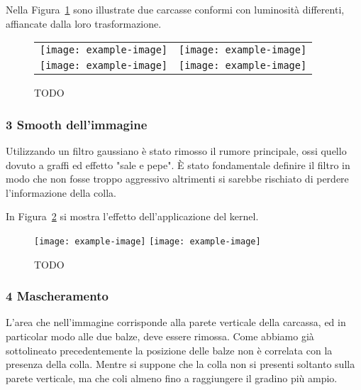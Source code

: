 Nella Figura~\ref{fig:equalizzazione} sono illustrate due carcasse conformi con luminosità differenti, affiancate dalla loro trasformazione.
\begin{figure}[ht] %
  \begin{center}
    \begin{tabular}{cc}
      \texttt{[image: example-image]} &
      \texttt{[image: example-image]} \\
      \texttt{[image: example-image]} &
      \texttt{[image: example-image]}
    \end{tabular}
    \label{fig:equalizzazione}
    \caption{TODO}
  \end{center}
\end{figure}


\subsubsection{3 Smooth dell'immagine}
Utilizzando un filtro gaussiano è stato rimosso il rumore principale, ossi quello dovuto a graffi ed effetto "sale e pepe".
È stato fondamentale definire il filtro in modo che non fosse troppo aggressivo altrimenti si sarebbe rischiato di perdere l'informazione della colla.

In Figura~\ref{fig:smooth} si mostra l'effetto dell'applicazione del kernel.
\begin{figure}[ht] %
  \begin{center}
    \texttt{[image: example-image]}
    \texttt{[image: example-image]}
    \label{fig:smooth}
    \caption{TODO}
  \end{center}
\end{figure}

\subsubsection{4 Mascheramento}
L'area che nell'immagine corrisponde alla parete verticale della carcassa, ed in particolar modo alle due balze, deve essere rimossa.
Come abbiamo già sottolineato precedentemente la posizione delle balze non è correlata con la presenza della colla.
Mentre si suppone che la colla non si presenti soltanto sulla parete verticale, ma che coli almeno fino a raggiungere il gradino più ampio.

